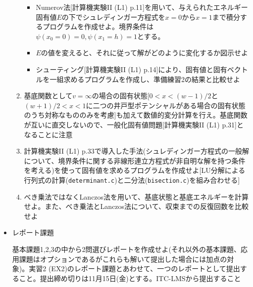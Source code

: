 \documentclass[11pt]{jarticle}
\begin{document}
\begin{itemize}
\begin{enumerate}
    \begin{itemize}
    \item Numerov法[計算機実験II (L1) p.11]を用いて、与えられたエネルギー固有値$E$の下でシュレディンガー方程式を$x=0$から$x=1$まで積分するプログラムを作成せよ。境界条件は$\psi(x_0=0)=0, \psi(x_1=h)=1$とする。
    \item $E$の値を変えると、それに従って解がどのように変化するか図示せよ
    \item シューティング[計算機実験II (L1) p.14]により、固有値と固有ベクトルを一組求めるプログラムを作成し、準備練習2の結果と比較せよ
    \end{itemize}
  \item 基底関数として$v=\infty$の場合の固有状態[$0<x<(w-1)/2$と$(w+1)/2<x<1$に二つの井戸型ポテンシャルがある場合の固有状態のうち対称なもののみを考慮]も加えて数値的変分計算を行え。基底関数が互いに直交しないので、一般化固有値問題[計算機実験II (L1) p.31]となることに注意
  \item 計算機実験II (L1) p.33で導入した手法(シュレディンガー方程式の一般解について、境界条件に関する非線形連立方程式が非自明な解を持つ条件を考える)を使って固有値を求めるプログラムを作成せよ[LU分解による行列式の計算({\tt determinant.c})と二分法({\tt bisection.c})を組み合わせる]
  \item べき乗法ではなくLanczos法を用いて、基底状態と基底エネルギーを計算せよ。また、べき乗法とLanczos法について、収束までの反復回数を比較せよ
  \end{enumerate}

\item レポート課題

基本課題1,2,3の中から2問選びレポートを作成せよ(それ以外の基本課題、応用課題はオプションであるがこれらも解いて提出した場合には加点の対象)。実習2 (EX2)のレポート課題とあわせて、一つのレポートとして提出すること。提出締め切りは11月15日(金)とする。ITC-LMSから提出すること

\end{itemize}
\end{document}
